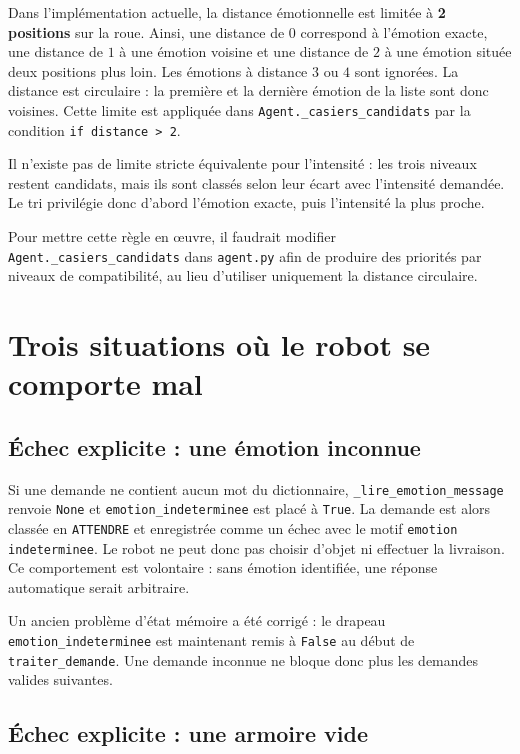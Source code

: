 \documentclass[11pt,a4paper]{article}
\begin{document}
Dans l'implémentation actuelle, la distance émotionnelle est limitée à
\textbf{2 positions} sur la roue. Ainsi, une distance de \(0\) correspond à
l'émotion exacte, une distance de \(1\) à une émotion voisine et une distance
de \(2\) à une émotion située deux positions plus loin. Les émotions à
distance \(3\) ou \(4\) sont ignorées. La distance est circulaire : la
première et la dernière émotion de la liste sont donc voisines. Cette limite
est appliquée dans \texttt{Agent.\_casiers\_candidats} par la condition
\texttt{if distance > 2}.

Il n'existe pas de limite stricte équivalente pour l'intensité : les trois
niveaux restent candidats, mais ils sont classés selon leur écart avec
l'intensité demandée. Le tri privilégie donc d'abord l'émotion exacte, puis
l'intensité la plus proche.

Pour mettre cette règle en œuvre, il faudrait modifier
\texttt{Agent.\_casiers\_candidats} dans \texttt{agent.py} afin de produire des
priorités par niveaux de compatibilité, au lieu d'utiliser uniquement la
distance circulaire. 



\section{Trois situations où le robot se comporte mal}

\subsection{Échec explicite : une émotion inconnue}

Si une demande ne contient aucun mot du dictionnaire,
\texttt{\_lire\_emotion\_message} renvoie \texttt{None} et
\texttt{emotion\_indeterminee} est placé à \texttt{True}. La demande est alors
classée en \texttt{ATTENDRE} et enregistrée comme un échec avec le motif
\texttt{emotion indeterminee}. Le robot ne peut donc pas choisir d'objet ni
effectuer la livraison. Ce comportement est volontaire : sans émotion
identifiée, une réponse automatique serait arbitraire.

Un ancien problème d'état mémoire a été corrigé : le drapeau
\texttt{emotion\_indeterminee} est maintenant remis à \texttt{False} au début de
\texttt{traiter\_demande}. Une demande inconnue ne bloque donc plus les
demandes valides suivantes.

\subsection{Échec explicite : une armoire vide}
\end{document}
